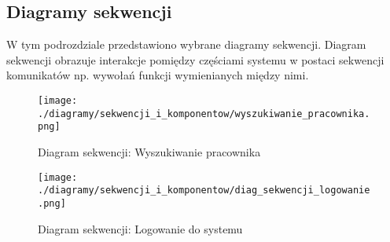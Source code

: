 \subsection{Diagramy sekwencji}
\begin{adjustwidth}{2em}{0pt}

W tym podrozdziale przedstawiono wybrane diagramy sekwencji. Diagram sekwencji obrazuje interakcje pomiędzy częściami systemu w postaci sekwencji komunikatów np. wywołań funkcji wymienianych między nimi. 

\begin{figure}[H]
    \centering
    \texttt{[image: ./diagramy/sekwencji\_i\_komponentow/wyszukiwanie\_pracownika.png]}
    \caption{Diagram sekwencji: Wyszukiwanie pracownika}
    \label{fig:wyszukiwanie_pracownika}
\end{figure} 

\begin{figure}[H]
    \centering
    \texttt{[image: ./diagramy/sekwencji\_i\_komponentow/diag\_sekwencji\_logowanie.png]}
    \caption{Diagram sekwencji: Logowanie do systemu}
    \label{fig:diag_sekwencji_logowanie.png}
\end{figure} 

\end{adjustwidth}

